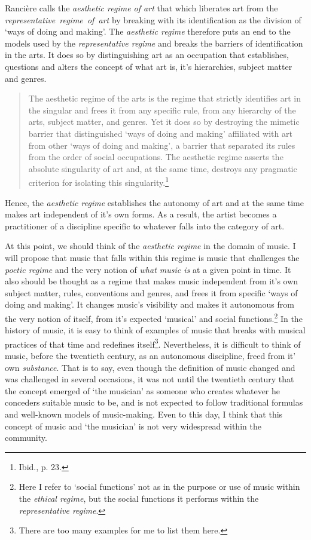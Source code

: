 Ranci\`{e}re calls the \emph{aesthetic regime of art} that which liberates art from the \mbox{\emph{representative regime of art}} by breaking with its identification as the division of `ways of doing and making'. The \emph{aesthetic regime} therefore puts an end to the models used by the \emph{representative regime} and breaks the barriers of identification in the arts. It does so by distinguishing art as an occupation that establishes, questions and alters the concept of what art is, it's hierarchies, subject matter and genres. 
\begin{quote}
The aesthetic regime of the arts is the regime that strictly identifies art in the singular and frees it from any specific rule, from any hierarchy of the arts, subject matter, and genres. Yet it does so by destroying the mimetic barrier that distinguished `ways of doing and making' affiliated with art from other `ways of doing and making', a barrier that separated its rules from the order of social occupations. The aesthetic regime asserts the absolute singularity of art and, at the same time, destroys any pragmatic criterion for isolating this singularity.\footnote{Ibid., p. 23.}
\end{quote}
Hence, the \emph{aesthetic regime} establishes the autonomy of art and at the same time makes art independent of it's own forms. As a result, the artist becomes a practitioner of a discipline specific to whatever falls into the category of art. 

At this point, we should think of the \emph{aesthetic regime} in the domain of music. I will propose that music that falls within this regime is music that challenges the \emph{poetic regime} and the very notion of \emph{what music is} at a given point in time. It also should be thought as a regime that makes music independent from it's own subject matter, rules, conventions and genres, and frees it from specific `ways of doing and making'. It changes music's visibility and makes it autonomous from the very notion of itself, from it's expected `musical' and social functions.\footnote{Here I refer to `social functions' not as in the purpose or use of music within the \emph{ethical regime}, but the social functions it performs within the \emph{representative regime}.} In the history of music, it is easy to think of examples of music that breaks with musical practices of that time and redefines itself\footnote{There are too many examples for me to list them here.}. Nevertheless, it is difficult to think of music, before the twentieth century, as an autonomous discipline, freed from it' own \emph{substance}. That is to say, even though the definition of music changed and was challenged in several occasions, it was not until the twentieth century that the concept emerged of `the musician' as someone who creates whatever he conceders suitable music to be, and is not expected to follow traditional formulas and well-known models of music-making. Even to this day, I think that this concept of music and `the musician' is not very widespread within the community.  

